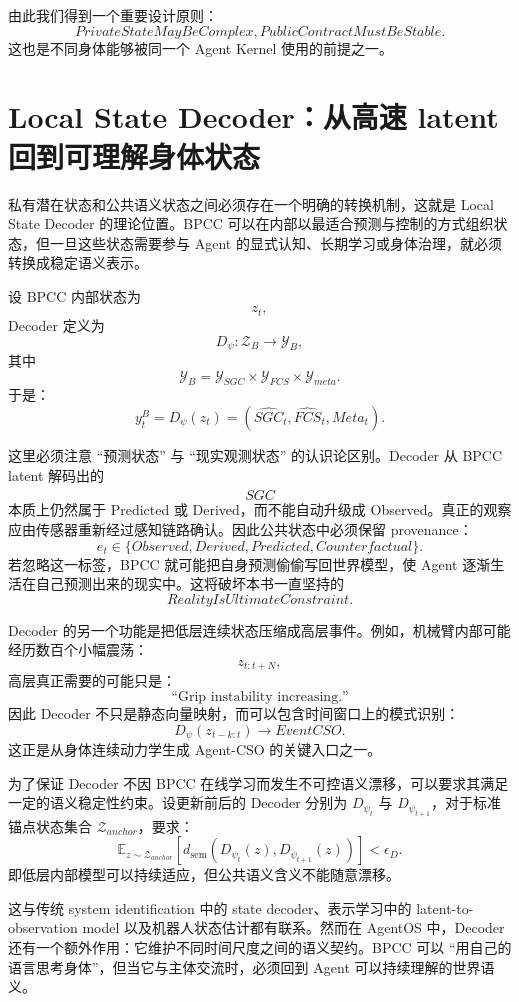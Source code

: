 由此我们得到一个重要设计原则：
\[
\boxed{
PrivateStateMayBeComplex,
PublicContractMustBeStable.
}
\]
这也是不同身体能够被同一个 Agent Kernel 使用的前提之一。

\section{Local State Decoder：从高速 latent 回到可理解身体状态}

私有潜在状态和公共语义状态之间必须存在一个明确的转换机制，这就是 Local State Decoder 的理论位置。BPCC 可以在内部以最适合预测与控制的方式组织状态，但一旦这些状态需要参与 Agent 的显式认知、长期学习或身体治理，就必须转换成稳定语义表示。

设 BPCC 内部状态为
\[
z_t,
\]
Decoder 定义为
\[
D_\psi:
\mathcal Z_B
\rightarrow
\mathcal Y_B,
\]
其中
\[
\mathcal Y_B
=
\mathcal Y_{SGC}
\times
\mathcal Y_{FCS}
\times
\mathcal Y_{meta}.
\]
于是：
\[
y_t^B
=
D_\psi(z_t)
=
(
\hat{SGC}_t,
\hat{FCS}_t,
Meta_t
).
\]

这里必须注意 ``预测状态'' 与 ``现实观测状态'' 的认识论区别。Decoder 从 BPCC latent 解码出的
\[
\hat{SGC}
\]
本质上仍然属于 Predicted 或 Derived，而不能自动升级成 Observed。真正的观察应由传感器重新经过感知链路确认。因此公共状态中必须保留 provenance：
\[
e_t
\in
\{
Observed,
Derived,
Predicted,
Counterfactual
\}.
\]
若忽略这一标签，BPCC 就可能把自身预测偷偷写回世界模型，使 Agent 逐渐生活在自己预测出来的现实中。这将破坏本书一直坚持的
\[
RealityIsUltimateConstraint.
\]

Decoder 的另一个功能是把低层连续状态压缩成高层事件。例如，机械臂内部可能经历数百个小幅震荡：
\[
z_{t:t+N},
\]
高层真正需要的可能只是：
\[
\text{``Grip instability increasing.''}
\]
因此 Decoder 不只是静态向量映射，而可以包含时间窗口上的模式识别：
\[
D_\psi
\left(
z_{t-k:t}
\right)
\rightarrow
EventCSO.
\]
这正是从身体连续动力学生成 Agent-CSO 的关键入口之一。

为了保证 Decoder 不因 BPCC 在线学习而发生不可控语义漂移，可以要求其满足一定的语义稳定性约束。设更新前后的 Decoder 分别为 $D_{\psi_t}$ 与 $D_{\psi_{t+1}}$，对于标准锚点状态集合 $\mathcal Z_{anchor}$，要求：
\[
\mathbb E_{z\sim\mathcal Z_{anchor}}
\left[
d_{\mathrm{sem}}
\left(
D_{\psi_t}(z),
D_{\psi_{t+1}}(z)
\right)
\right]
<
\epsilon_D.
\]
即低层内部模型可以持续适应，但公共语义含义不能随意漂移。

这与传统 system identification 中的 state decoder、表示学习中的 latent-to-observation model 以及机器人状态估计都有联系。然而在 AgentOS 中，Decoder 还有一个额外作用：它维护不同时间尺度之间的语义契约。BPCC 可以 ``用自己的语言思考身体''，但当它与主体交流时，必须回到 Agent 可以持续理解的世界语义。

